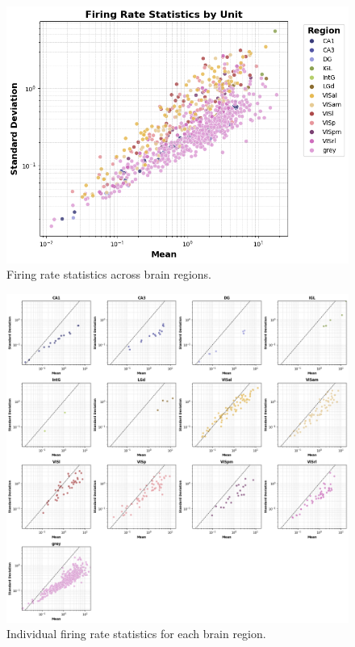 \documentclass[10pt,twocolumn]{article}
\begin{document}
\begin{figure}[ht]
  \centering
  \includegraphics[width=\linewidth]{report_images/unit_firing_rate_statistics.png}
  \caption{Firing rate statistics across brain regions.}
  \label{fig:firing_rate_stats}
\end{figure}

\begin{figure}[H]
  \centering
  \includegraphics[width=\linewidth]{report_images/unit_firing_rate_statistics_single.png}
  \caption{Individual firing rate statistics for each brain region.}
  \label{fig:firing_rate_single}
\end{figure}
\end{document}
